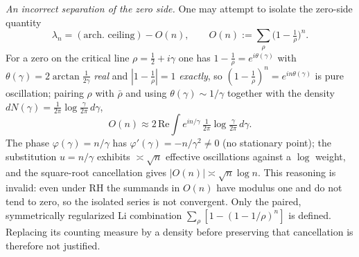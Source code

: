 \documentclass[11pt]{amsart}
\theoremstyle{definition}
\theoremstyle{remark}
\theoremstyle{definition}
\begin{document}
\emph{An incorrect separation of the zero side.}  One may attempt to isolate the zero-side
quantity
\[
   \lambda_n=(\text{arch.\ ceiling})-O(n),\qquad O(n):=\sum_\rho\Big(1-\tfrac1\rho\Big)^{\!n}.
\]
For a zero on the critical line $\rho=\tfrac12+i\gamma$ one has $1-\tfrac1\rho=e^{i\theta(\gamma)}$ with
$\theta(\gamma)=2\arctan\tfrac{1}{2\gamma}$ \emph{real} and $|1-\tfrac1\rho|=1$ \emph{exactly}, so
$(1-\tfrac1\rho)^n=e^{in\theta(\gamma)}$ is pure oscillation; pairing $\rho$ with $\bar\rho$ and using
$\theta(\gamma)\sim1/\gamma$ together with the density
$dN(\gamma)=\tfrac{1}{2\pi}\log\tfrac{\gamma}{2\pi}\,d\gamma$,
\[
   O(n)\approx2\,\mathrm{Re}\!\int e^{in/\gamma}\,\tfrac{1}{2\pi}\log\tfrac{\gamma}{2\pi}\,d\gamma .
\]
The phase $\varphi(\gamma)=n/\gamma$ has $\varphi'(\gamma)=-n/\gamma^2\neq0$ (no stationary point); the
substitution $u=n/\gamma$ exhibits $\asymp\sqrt n$ effective oscillations against a $\log$ weight, and
the square-root cancellation gives $|O(n)|\asymp\sqrt n\log n$.  This reasoning is invalid: even
under RH the summands in $O(n)$ have modulus one and do not tend to zero, so the isolated series is not
convergent.  Only the paired, symmetrically regularized Li combination
$\sum_\rho[1-(1-1/\rho)^n]$ is defined.  Replacing its counting measure by a density before preserving
that cancellation is therefore not justified.
\end{document}
